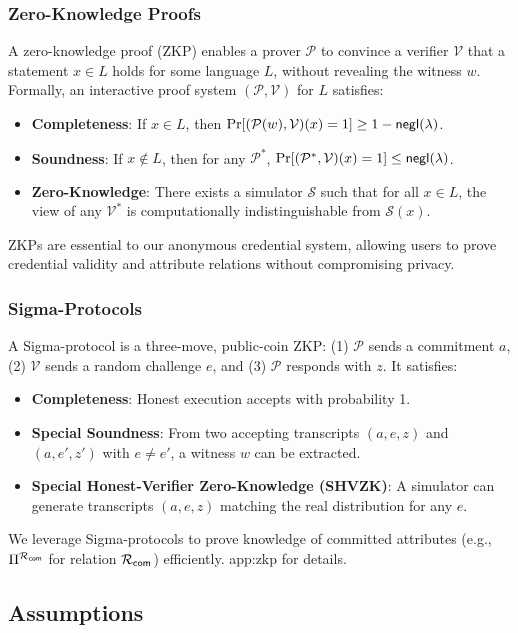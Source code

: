 \subsubsection{Zero-Knowledge Proofs}
A zero-knowledge proof (ZKP) enables a prover $\mathcal{P}$ to convince a verifier $\mathcal{V}$ that a statement $x \in L$ holds for some language $L$, without revealing the witness $w$. Formally, an interactive proof system $(\mathcal{P}, \mathcal{V})$ for $L$ satisfies:
\begin{itemize}
    \item \textbf{Completeness}: If $x \in L$, then $\Pr[(\mathcal{P}(w), \mathcal{V})(x) = 1] \geq 1 - \mathsf{negl}(\lambda)$.
    \item \textbf{Soundness}: If $x \notin L$, then for any $\mathcal{P}^*$, $\Pr[(\mathcal{P}^*, \mathcal{V})(x) = 1] \leq \mathsf{negl}(\lambda)$.
    \item \textbf{Zero-Knowledge}: There exists a simulator $\mathcal{S}$ such that for all $x \in L$, the view of any $\mathcal{V}^*$ is computationally indistinguishable from $\mathcal{S}(x)$.
\end{itemize}
ZKPs are essential to our anonymous credential system, allowing users to prove credential validity and attribute relations without compromising privacy.

\subsubsection{Sigma-Protocols}
A Sigma-protocol is a three-move, public-coin ZKP: (1) $\mathcal{P}$ sends a commitment $a$, (2) $\mathcal{V}$ sends a random challenge $e$, and (3) $\mathcal{P}$ responds with $z$. It satisfies:
\begin{itemize}
    \item \textbf{Completeness}: Honest execution accepts with probability 1.
    \item \textbf{Special Soundness}: From two accepting transcripts $(a, e, z)$ and $(a, e', z')$ with $e \neq e'$, a witness $w$ can be extracted.
    \item \textbf{Special Honest-Verifier Zero-Knowledge (SHVZK)}: A simulator can generate transcripts $(a, e, z)$ matching the real distribution for any $e$.
\end{itemize}
We leverage Sigma-protocols to prove knowledge of committed attributes (e.g., $\Pi^{\mathcal{R}_{\mathsf{com}}}$ for relation ${\mathcal{R}_{\mathsf{com}}}$) efficiently. app:zkp for details. %

\subsection{Assumptions}


